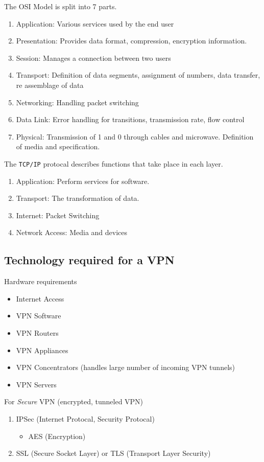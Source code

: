 \documentclass[../notes.tex]{subfiles}
\begin{document}
The OSI Model is split into 7 parts. 
\begin{enumerate}
	\item Application: Various services used by the end user
	\item Presentation: Provides data format, compression, encryption information.
	\item Session: Manages a connection between two users
	\item Transport: Definition of data segments, assignment of numbers, data transfer, re assemblage of data 
	\item Networking: Handling packet switching
	\item Data Link: Error handling for transitions, transmission rate, flow control
	\item Physical: Transmission of 1 and 0 through cables and microwave. Definition of media and specification.
\end{enumerate}

The \texttt{TCP/IP} protocal describes functions that take place in each layer. 
\begin{enumerate}
	\item Application: Perform services for software.
	\item Transport: The transformation of data.
	\item Internet: Packet Switching
	\item Network Access: Media and devices
\end{enumerate}

\subsection{Technology required for a VPN}
Hardware requirements
\begin{itemize}
	\item Internet Access
	\item VPN Software
	\item VPN Routers
	\item VPN Appliances
	\item VPN Concentrators (handles large number of incoming VPN tunnels)
	\item VPN Servers
\end{itemize}

For \textit{Secure} VPN (encrypted, tunneled VPN)
\begin{enumerate}
	\item IPSec (Internet Protocal, Security Protocal)
		\begin{itemize}
			\item AES (Encryption)
		\end{itemize}
	\item SSL (Secure Socket Layer) or TLS (Transport Layer Security)
\end{enumerate}
\end{document}
